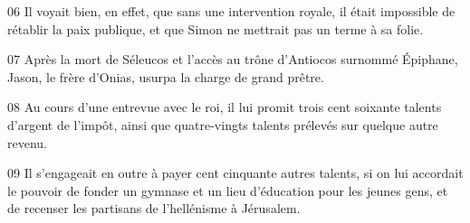 
06 Il voyait bien, en effet, que sans une intervention royale, il était impossible de rétablir la paix publique, et que Simon ne mettrait pas un terme à sa folie.

07 Après la mort de Séleucos et l’accès au trône d’Antiocos surnommé Épiphane, Jason, le frère d’Onias, usurpa la charge de grand prêtre.

08 Au cours d’une entrevue avec le roi, il lui promit trois cent soixante talents d’argent de l’impôt, ainsi que quatre-vingts talents prélevés sur quelque autre revenu.

09 Il s’engageait en outre à payer cent cinquante autres talents, si on lui accordait le pouvoir de fonder un gymnase et un lieu d’éducation pour les jeunes gens, et de recenser les partisans de l’hellénisme à Jérusalem.
